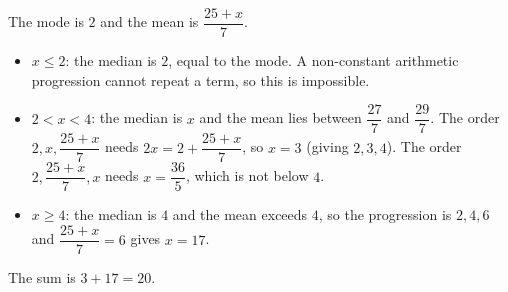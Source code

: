 The mode is $2$ and the mean is $\dfrac{25+x}{7}$.
\begin{itemize}
\item $x\le2$: the median is $2$, equal to the mode. A non-constant arithmetic progression cannot repeat a term, so this is impossible.
\item $2<x<4$: the median is $x$ and the mean lies between $\dfrac{27}{7}$ and $\dfrac{29}{7}$. The order $2,x,\dfrac{25+x}{7}$ needs $2x=2+\dfrac{25+x}{7}$, so $x=3$ (giving $2,3,4$). The order $2,\dfrac{25+x}{7},x$ needs $x=\dfrac{36}{5}$, which is not below $4$.
\item $x\ge4$: the median is $4$ and the mean exceeds $4$, so the progression is $2,4,6$ and $\dfrac{25+x}{7}=6$ gives $x=17$.
\end{itemize}
The sum is $3+17=\boxed{20}$.
